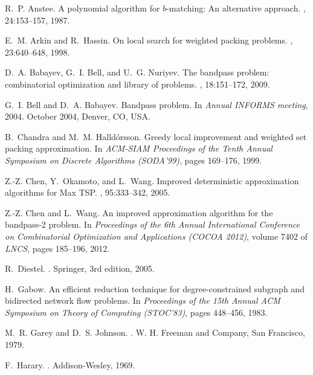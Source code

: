 \documentclass[11pt,twoside]{article}\usepackage{amssymb,latexsym,graphicx,hyperref}\usepackage{epstopdf}
\begin{document}
\begin{thebibliography}{10}

R.~P. Anstee.
\newblock A polynomial algorithm for $b$-matching: An alternative approach.
, 24:153--157, 1987.

E.~M. Arkin and R.~Hassin.
\newblock On local search for weighted packing problems.
, 23:640--648, 1998.

D.~A. Babayev, G.~I. Bell, and U.~G. Nuriyev.
\newblock The bandpass problem: combinatorial optimization and library of
  problems.
, 18:151--172, 2009.

G.~I. Bell and D.~A. Babayev.
\newblock Bandpass problem.
\newblock In {\em Annual INFORMS meeting}, 2004.
\newblock October 2004, Denver, CO, USA.

B.~Chandra and M.~M. Halld\'{o}rsson.
\newblock Greedy local improvement and weighted set packing approximation.
\newblock In {\em ACM-SIAM Proceedings of the Tenth Annual Symposium on
  Discrete Algorithms (SODA'99)}, pages 169--176, 1999.

Z.-Z. Chen, Y.~Okamoto, and L.~Wang.
\newblock Improved deterministic approximation algorithms for {Max} {TSP}.
, 95:333--342, 2005.

Z.-Z. Chen and L.~Wang.
\newblock An improved approximation algorithm for the bandpass-2 problem.
\newblock In {\em Proceedings of the 6th Annual International Conference on
  Combinatorial Optimization and Applications (COCOA 2012)}, volume 7402 of
  {\em LNCS}, pages 185--196, 2012.

R.~Diestel.
.
\newblock Springer, 3rd edition, 2005.

H.~Gabow.
\newblock An efficient reduction technique for degree-constrained subgraph and
  bidirected network flow problems.
\newblock In {\em Proceedings of the 15th Annual ACM Symposium on Theory of
  Computing (STOC'83)}, pages 448--456, 1983.

M.~R. Garey and D.~S. Johnson.
.
\newblock W. H. Freeman and Company, San Francisco, 1979.

F.~Harary.
.
\newblock Addison-Wesley, 1969.


\end{thebibliography}
\end{document}
